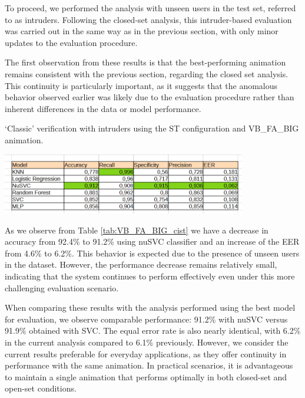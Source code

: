\documentclass[12pt]{report}
\begin{document}
To proceed, we performed the analysis with unseen users in the test set, referred to as intruders.
Following the closed-set analysis, this intruder-based evaluation was carried out in the same way as in the previous section, with only minor updates to the evaluation procedure.

The first observation from these results is that the best-performing animation remains consistent with the previous section, regarding the closed set analysis.
This continuity is particularly important, as it suggests that the anomalous behavior observed earlier was likely due to the evaluation procedure rather than inherent differences in the data or model performance.

\begin{table}[ht]
    \centering
    \caption{‘Classic’ verification with intruders using the ST configuration and VB\_FA\_BIG animation.}
    \includegraphics[width=0.8\textwidth]{Images/Results/Classic_procedure/Verification_intruders/st/VB_FA_BIG.png}
    \label{tab:VB_FA_BIG_cist}
\end{table}


As we observe from Table \ref{tab:VB_FA_BIG_cist} we have a decrease in accuracy from 92.4\% to 91.2\% using nuSVC classifier and an increase of the EER from 4.6\% to 6.2\%.
This behavior is expected due to the presence of unseen users in the dataset.
However, the performance decrease remains relatively small, indicating that the system continues to perform effectively even under this more challenging evaluation scenario.

When comparing these results with the analysis performed using the best model for evaluation, we observe comparable performance: 91.2\% with nuSVC versus 91.9\% obtained with SVC. 
The equal error rate is also nearly identical, with 6.2\% in the current analysis compared to 6.1\% previously. 
However, we consider the current results preferable for everyday applications, as they offer continuity in performance with the same animation. 
In practical scenarios, it is advantageous to maintain a single animation that performs optimally in both closed-set and open-set conditions.
\end{document}
